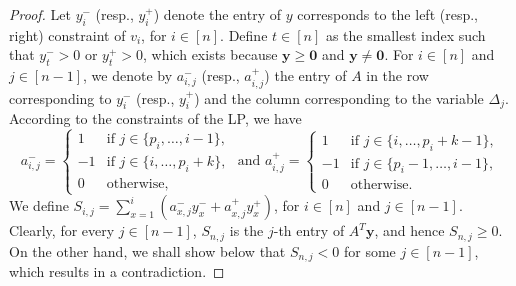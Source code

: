 \documentclass[11pt]{article}
\begin{document}
\begin{proof}
Let $y_i^-$ (resp., $y_i^+$) denote the entry of $y$ corresponds to the left (resp., right) constraint of $v_i$, for $i \in [n]$.
Define $t \in [n]$ as the smallest index such that $y_t^- > 0$ or $y_t^+ > 0$, which exists because $\mathbf{y} \geq \mathbf{0}$ and $\mathbf{y} \neq \mathbf{0}$.
For $i \in [n]$ and $j \in [n-1]$, we denote by $a_{i,j}^-$ (resp., $a_{i,j}^+$) the entry of $A$ in the row corresponding to $y_i^-$ (resp., $y_i^+$) and the column corresponding to the variable $\Delta_j$.
According to the constraints of the LP, we have
\begin{equation*}
    a_{i,j}^- = \left\{
    \begin{array}{ll}
        1 & \text{if } j \in \{p_i,\dots,i-1\}, \\
        -1 & \text{if } j \in \{i,\dots,p_i+k\}, \\
        0 & \text{otherwise},
    \end{array}
    \right.
    \text{ and \ }
    a_{i,j}^+ = \left\{
    \begin{array}{ll}
        1 & \text{if } j \in \{i,\dots,p_i+k-1\}, \\
        -1 & \text{if } j \in \{p_i-1,\dots,i-1\}, \\
        0 & \text{otherwise}.
    \end{array}
    \right.
\end{equation*}
We define $S_{i,j} = \sum_{x=1}^i (a_{x,j}^- y_x^- + a_{x,j}^+ y_x^+)$, for $i \in [n]$ and $j \in [n-1]$.
Clearly, for every $j \in [n-1]$, $S_{n,j}$ is the $j$-th entry of $A^T \mathbf{y}$, and hence $S_{n,j} \geq 0$.
On the other hand, we shall show below that $S_{n,j} < 0$ for some $j \in [n-1]$, which results in a contradiction.


\end{proof}
\end{document}
